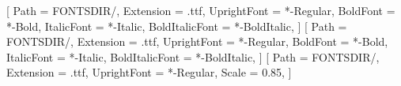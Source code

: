 \usepackage{fontspec}
\setmainfont{NotoSans}[
  Path = FONTSDIR/,
  Extension = .ttf,
  UprightFont = *-Regular,
  BoldFont = *-Bold,
  ItalicFont = *-Italic,
  BoldItalicFont = *-BoldItalic,
]
\setsansfont{NotoSans}[
  Path = FONTSDIR/,
  Extension = .ttf,
  UprightFont = *-Regular,
  BoldFont = *-Bold,
  ItalicFont = *-Italic,
  BoldItalicFont = *-BoldItalic,
]
\setmonofont{NotoSansMono}[
  Path = FONTSDIR/,
  Extension = .ttf,
  UprightFont = *-Regular,
  Scale = 0.85,
]

\usepackage{xcolor}
\usepackage{colortbl}

\usepackage{etoolbox}

\usepackage{fvextra}
\usepackage{framed}
\makeatletter
{}
\makeatother


\usepackage{float}
